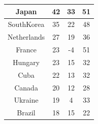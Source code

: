 \documentclass{mcmthesis}
\begin{document}
\begin{table}
\begin{tabular}{|c|ccc|}
\hline
{\cellcolor[rgb]{0.992,0.737,0.529}}Japan                                                                        & 42                                                              & 33                                      & 51                                       \\ 
\hline
\rowcolor[rgb]{1,0.824,0.635} {\cellcolor[rgb]{0.992,0.737,0.529}}SouthKorea                                     & 35                                                              & 22                                      & 48                                       \\ 
\hline
{\cellcolor[rgb]{0.992,0.737,0.529}}Netherlands                                                                  & 27                                                              & 19                                      & 36                                       \\ 
\hline
\rowcolor[rgb]{1,0.824,0.635} {\cellcolor[rgb]{0.992,0.737,0.529}}France                                         & 23                                                              & -4                                      & 51                                       \\ 
\hline
{\cellcolor[rgb]{0.992,0.737,0.529}}Hungary                                                                      & 23                                                              & 15                                      & 32                                       \\ 
\hline
\rowcolor[rgb]{1,0.824,0.635} {\cellcolor[rgb]{0.992,0.737,0.529}}Cuba                                           & 22                                                              & 13                                      & 32                                       \\ 
\hline
{\cellcolor[rgb]{0.992,0.737,0.529}}Canada                                                                       & 20                                                              & 12                                      & 28                                       \\ 
\hline
\rowcolor[rgb]{1,0.824,0.635} {\cellcolor[rgb]{0.992,0.737,0.529}}Ukraine                                        & 19                                                              & 4                                       & 33                                       \\ 
\hline
{\cellcolor[rgb]{0.992,0.737,0.529}}Brazil                                                                       & 18                                                              & 15                                      & 22                                       \\ 

\end{tabular}
\end{table}
\end{document}
